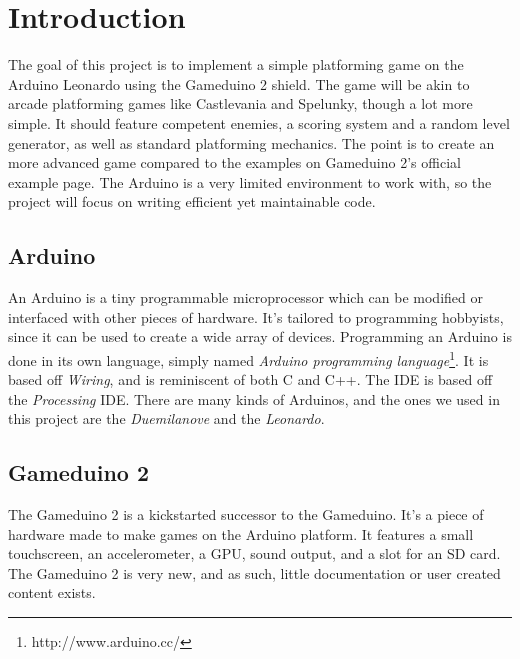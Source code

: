 \chapter{Introduction}
The goal of this project is to implement a simple platforming game on the Arduino Leonardo using the Gameduino 2 shield. The game will be akin to arcade platforming games like Castlevania and Spelunky, though a lot more simple. It should feature competent enemies, a scoring system and a random level generator, as well as standard platforming mechanics.
\newline
The point is to create an more advanced game compared to the examples on Gameduino 2's official example page. The Arduino is a very limited environment to work with, so the project will focus on writing efficient yet maintainable code.

\section{Arduino} %
An Arduino is a tiny programmable microprocessor which can be modified or interfaced with other pieces of hardware. It's tailored to programming hobbyists, since it can be used to create a wide array of devices. Programming an Arduino is done in its own language, simply named \emph{Arduino programming language}\footnote{http://www.arduino.cc/}. It is based off \emph{Wiring}, and is reminiscent of both C and C++. The IDE is based off the \emph{Processing} IDE. There are many kinds of Arduinos, and the ones we used in this project are the \emph{Duemilanove} and the \emph{Leonardo}.

\section{Gameduino 2}
The Gameduino 2 is a kickstarted successor to the Gameduino. It's a piece of hardware made to make games on the Arduino platform. It features a small touchscreen, an accelerometer, a GPU, sound output, and a slot for an SD card. The Gameduino 2 is very new, and as such, little documentation or user created content exists.